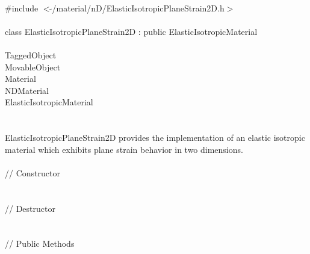 
   \\
\indent \#include $<\tilde{ }$/material/nD/ElasticIsotropicPlaneStrain2D.h$>$  \\

  \\
\indent class ElasticIsotropicPlaneStrain2D : public ElasticIsotropicMaterial \\

 \\
\indent TaggedObject \\
\indent MovableObject \\
\indent\indent Material \\
\indent\indent\indent NDMaterial \\
\indent\indent\indent\indent ElasticIsotropicMaterial \\
\indent\indent\indent\indent{} \\

  \\
ElasticIsotropicPlaneStrain2D provides the implementation of an
elastic isotropic material which exhibits plane strain behavior in two
dimensions. \\

 \\
\indent // Constructor \\
  \\ \\
\indent // Destructor \\
\\ \\
\indent // Public Methods \\
 \\
 \\
 \\
 \\
 \\
 \\
 \\


